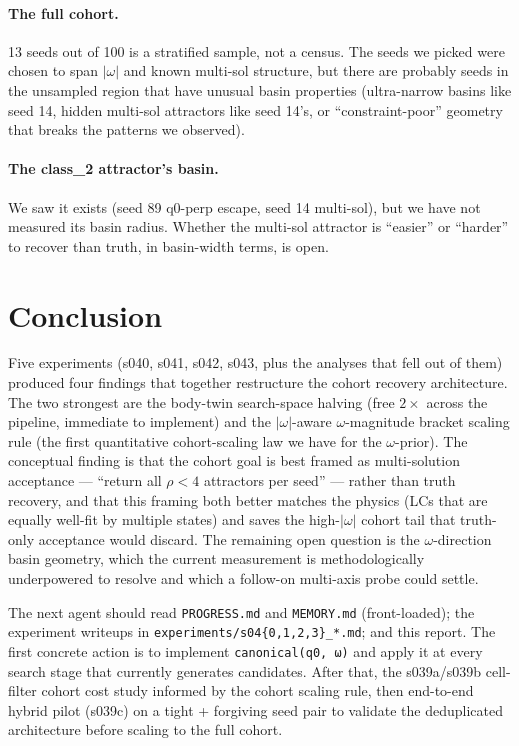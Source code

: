 \documentclass[11pt,a4paper]{article}
\begin{document}
\paragraph{The full cohort.} 13 seeds out of 100 is a stratified sample, not a census. The seeds we picked were chosen to span $|\omega|$ and known multi-sol structure, but there are probably seeds in the unsampled region that have unusual basin properties (ultra-narrow basins like seed 14, hidden multi-sol attractors like seed 14's, or ``constraint-poor'' geometry that breaks the patterns we observed).

\paragraph{The class\_2 attractor's basin.} We saw it exists (seed 89 q0-perp escape, seed 14 multi-sol), but we have not measured its basin radius. Whether the multi-sol attractor is ``easier'' or ``harder'' to recover than truth, in basin-width terms, is open.

\section{Conclusion}
\label{sec:conclusion}

Five experiments (s040, s041, s042, s043, plus the analyses that fell out of them) produced four findings that together restructure the cohort recovery architecture. The two strongest are the body-twin search-space halving (free $2\times$ across the pipeline, immediate to implement) and the $|\omega|$-aware $\omega$-magnitude bracket scaling rule (the first quantitative cohort-scaling law we have for the $\omega$-prior). The conceptual finding is that the cohort goal is best framed as multi-solution acceptance --- ``return all $\rho < 4$ attractors per seed'' --- rather than truth recovery, and that this framing both better matches the physics (LCs that are equally well-fit by multiple states) and saves the high-$|\omega|$ cohort tail that truth-only acceptance would discard. The remaining open question is the $\omega$-direction basin geometry, which the current measurement is methodologically underpowered to resolve and which a follow-on multi-axis probe could settle.

The next agent should read \texttt{PROGRESS.md} and \texttt{MEMORY.md} (front-loaded); the experiment writeups in \texttt{experiments/s04\{0,1,2,3\}\_*.md}; and this report. The first concrete action is to implement \texttt{canonical(q0, ω)} and apply it at every search stage that currently generates candidates. After that, the s039a/s039b cell-filter cohort cost study informed by the cohort scaling rule, then end-to-end hybrid pilot (s039c) on a tight + forgiving seed pair to validate the deduplicated architecture before scaling to the full cohort.
\end{document}
